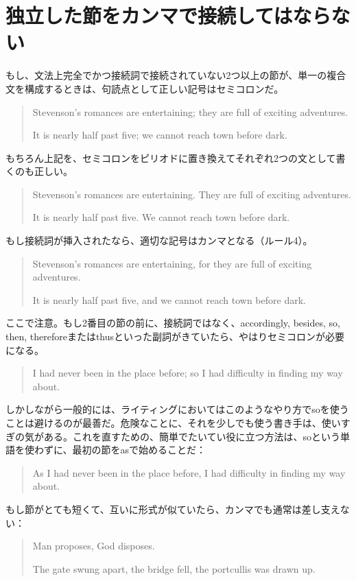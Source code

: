 \section{独立した節をカンマで接続してはならない}
もし、文法上完全でかつ接続詞で接続されていない2つ以上の節が、単一の複合文を構成するときは、句読点として正しい記号はセミコロンだ。
\begin{quote}
Stevenson's romances are entertaining; they are full of exciting
adventures.

It is nearly half past five; we cannot reach town before dark.    
\end{quote}
もちろん上記を、セミコロンをピリオドに置き換えてそれぞれ2つの文として書くのも正しい。
\begin{quote}
Stevenson's romances are entertaining. They are full of exciting adventures.

It is nearly half past five. We cannot reach town before dark.
\end{quote}
もし接続詞が挿入されたなら、適切な記号はカンマとなる（ルール4）。
\begin{quote}
Stevenson's romances are entertaining, for they are full of exciting
adventures.

It is nearly half past five, and we cannot reach town before dark.    
\end{quote}
ここで注意。もし2番目の節の前に、接続詞ではなく、accordingly, besides, so, then, thereforeまたはthusといった副詞がきていたら、やはりセミコロンが必要になる。
\begin{quote}
I had never been in the place before; so I had difficulty in finding my
way about.    
\end{quote}
しかしながら一般的には、ライティングにおいてはこのようなやり方でsoを使うことは避けるのが最善だ。危険なことに、それを少しでも使う書き手は、使いすぎの気がある。これを直すための、簡単でたいてい役に立つ方法は、soという単語を使わずに、最初の節をasで始めることだ：
\begin{quote}
As I had never been in the place before, I had difficulty in finding my
way about.    
\end{quote}
もし節がとても短くて、互いに形式が似ていたら、カンマでも通常は差し支えない：
\begin{quote}
Man proposes, God disposes.

The gate swung apart, the bridge fell, the portcullis was drawn up.    
\end{quote}
